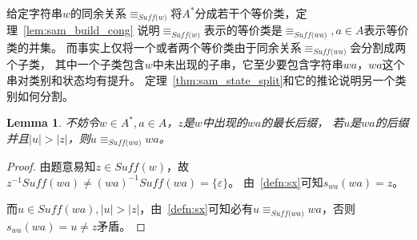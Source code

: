 \documentclass[UTF8]{ctexart}
\newtheorem{lem}[thm]{Lemma}
\theoremstyle{definition}
\theoremstyle{remark}
\numberwithin{equation}{subsection}
\newcommand{\equsuf}[1][x]{\equiv_{\textit{Suff(#1)}}}
\newcommand{\Suff}{\textit{Suff}}
\begin{document}
	给定字符串$w$的同余关系$\equsuf[w]$将$A^*$分成若干个等价类，定理~\ref{lem:sam_build_cong}
	说明$\equsuf[w]$表示的等价类是$\equsuf[wa], a \in A$表示等价类的并集。
	而事实上仅将一个或者两个等价类由于同余关系$\equsuf[wa]$会分割成两个子类，
	其中一个子类包含$w$中未出现的子串，它至少要包含字符串$wa$，$wa$这个串对类别和状态均有提升。
	定理~\ref{thm:sam_state_split}和它的推论说明另一个类别如何分割。
	
	\begin{lem}
	\label{lem:longest_suf_equ}
		不妨令$w \in A^*, a \in A$，$z$是$w$中出现的$wa$的最长后缀，
		若$u$是$wa$的后缀并且$|u| > |z|$，则$u \equsuf[wa] wa$。
	\end{lem}
	\begin{proof}
		由题意易知$z \in \Suff(w)$，故$z^{-1} \Suff(wa) \neq (wa)^{-1} \Suff(wa) = \{ \varepsilon \}$。
		由~\ref{defn:sx}可知$s_{wa}(wa) = z$。
		
		而$u \in \Suff(wa), |u| > |z|$，由~\ref{defn:sx}可知必有$u \equsuf[wa] wa$，否则$s_{wa}(wa) = u \neq z$矛盾。
	\end{proof}
	
\end{document}
